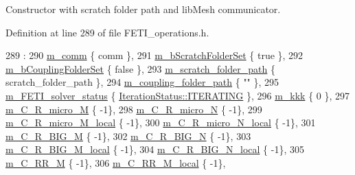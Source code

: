 Constructor with scratch folder path and lib\+Mesh communicator. 



Definition at line 289 of file F\+E\+T\+I\+\_\+operations.\+h.


\begin{DoxyCode}
289                                                                                              :
290         \hyperlink{classcarl_1_1_f_e_t_i___operations_a8cb0ed286667fc9f3ebc2d8ef2a3e13b}{m\_comm} \{ comm \},
291         \hyperlink{classcarl_1_1_f_e_t_i___operations_a8bb9de7de35a2f7d7d5982ae1085ba15}{m\_bScratchFolderSet} \{ \textcolor{keyword}{true} \},
292         \hyperlink{classcarl_1_1_f_e_t_i___operations_a99e19ecbfadee9c10545ba8ca0682f33}{m\_bCouplingFolderSet} \{ \textcolor{keyword}{false} \},
293         \hyperlink{classcarl_1_1_f_e_t_i___operations_ad6d35bc9b5221d45452fbc8931f22055}{m\_scratch\_folder\_path} \{ scratch\_folder\_path \},
294         \hyperlink{classcarl_1_1_f_e_t_i___operations_a2eee572375e0b5aab15f31fb55f2e48f}{m\_coupling\_folder\_path} \{ \textcolor{stringliteral}{""} \},
295         \hyperlink{classcarl_1_1_f_e_t_i___operations_a36365b5c60a575b2becf805d355bacff}{m\_FETI\_solver\_status} \{ \hyperlink{namespacecarl_aa16a7148474e795cb6fea24b9159dccbace49062f1507d7b0433fc456c23e4756}{IterationStatus::ITERATING} \},
296         \hyperlink{classcarl_1_1_f_e_t_i___operations_aae9d8e6d2d0436cda061359f1602b096}{m\_kkk} \{ 0 \},
297         \hyperlink{classcarl_1_1_f_e_t_i___operations_a3a6e9ba77124f48329021505abe6a547}{m\_C\_R\_micro\_M} \{ -1\},
298         \hyperlink{classcarl_1_1_f_e_t_i___operations_a067cab6ead10411079ae05a812c35d53}{m\_C\_R\_micro\_N} \{ -1\},
299         \hyperlink{classcarl_1_1_f_e_t_i___operations_a546bd50866d9e1aa7cab05d688574cfd}{m\_C\_R\_micro\_M\_local} \{ -1\},
300         \hyperlink{classcarl_1_1_f_e_t_i___operations_a6c67394d9e538b1280b7059ff0258577}{m\_C\_R\_micro\_N\_local} \{ -1\},
301         \hyperlink{classcarl_1_1_f_e_t_i___operations_a8c26f1927c4b8825fe96ddfa51410c56}{m\_C\_R\_BIG\_M} \{ -1\},
302         \hyperlink{classcarl_1_1_f_e_t_i___operations_a70409f475e309e5fbcea9be931aa321b}{m\_C\_R\_BIG\_N} \{ -1\},
303         \hyperlink{classcarl_1_1_f_e_t_i___operations_adb43af921deb83b507b3af27d7ac2e1f}{m\_C\_R\_BIG\_M\_local} \{ -1\},
304         \hyperlink{classcarl_1_1_f_e_t_i___operations_a87856fb17203f71c386d800b1021e483}{m\_C\_R\_BIG\_N\_local} \{ -1\},
305         \hyperlink{classcarl_1_1_f_e_t_i___operations_a8212c6fec9ded9faeb36cc3ce18f2e35}{m\_C\_RR\_M} \{ -1\},
306         \hyperlink{classcarl_1_1_f_e_t_i___operations_a2401278970b5cc7087ebbf1746c64d35}{m\_C\_RR\_M\_local} \{ -1\},

\end{DoxyCode}
